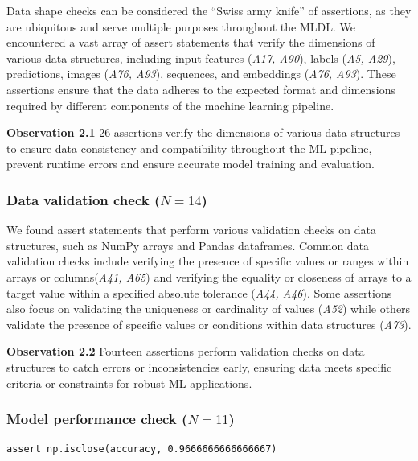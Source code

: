 \documentclass[journal]{IEEEtran}       %
\newcommand{\highlight}[1]{
  \begin{framed}%
    \noindent#1
\end{framed}}
\begin{document}
Data shape checks can be considered the ``Swiss army knife'' of
assertions, as they are ubiquitous and serve multiple purposes
throughout the MLDL. We encountered a vast array of assert statements
that verify the dimensions of various data structures, including
input features (\emph{A17, A90}), labels (\emph{A5, A29}),
predictions, images (\emph{A76, A93}), sequences, and embeddings
(\emph{A76, A93}). These assertions ensure that the data adheres to
the expected format and dimensions required by different components
of the machine learning pipeline.

\highlight{\textbf{Observation 2.1} 26 assertions verify the
  dimensions of various data structures to ensure data consistency and
  compatibility throughout the ML pipeline, prevent runtime errors and
ensure accurate model training and evaluation.}

\subsubsection{Data validation check ($N = 14$)}

We found assert statements that perform various validation checks on
data structures, such as NumPy arrays and Pandas dataframes. Common
data validation checks include verifying the presence of specific
values or ranges within arrays or columns(\emph{A41, A65}) and
verifying the equality or closeness of arrays to a target value
within a specified absolute tolerance (\emph{A44, A46}). Some
assertions also focus on validating the uniqueness or cardinality of
values (\emph{A52}) while others validate the presence of specific
values or conditions within data structures (\emph{A73}).

\highlight{\textbf{Observation 2.2} Fourteen assertions perform
  validation checks on data structures to catch errors or
  inconsistencies early, ensuring data meets specific criteria or
constraints for robust ML applications.}

\subsubsection{Model performance check ($N = 11$)}\label{sec:assert-model-perf}

\begin{lstlisting}[caption={Assertion \emph{A58} used to check that the accuracy of a model is close to the specified value. The use of \lstinline{np.isclose} allows for small deviations in the accuracy thus accounting for the stochastic nature of ML models.}, label={lst:A58}]
assert np.isclose(accuracy, 0.9666666666666667)
\end{lstlisting}
\end{document}
